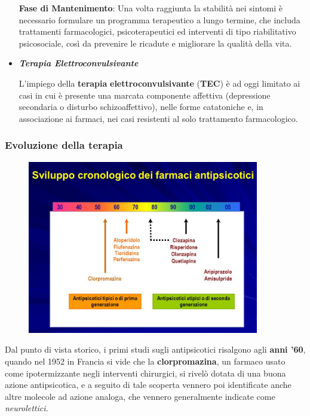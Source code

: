 \begin{itemize}
\textbf{Fase di Mantenimento}: Una volta raggiunta la stabilità nei
sintomi è necessario formulare un programma terapeutico a lungo termine,
che includa trattamenti farmacologici, psicoterapeutici ed interventi di
tipo riabilitativo psicosociale, così da prevenire le ricadute e
migliorare la qualità della vita.

\item
  \textbf{\emph{Terapia Elettroconvulsivante}}

L'impiego della \textbf{terapia} \textbf{elettroconvulsivante}
(\textbf{TEC}) è ad oggi limitato ai casi in cui è presente una marcata
componente affettiva (depressione secondaria o disturbo
schizoaffettivo), nelle forme catatoniche e, in associazione ai farmaci,
nei casi resistenti al solo trattamento farmacologico.

\end{itemize}

\subsubsection{Evoluzione della terapia}

\begin{figure}[!ht]
\centering
	\includegraphics[width=0.9\textwidth]{07/image2.jpeg}
\end{figure}

Dal punto di vista storico, i primi studi sugli antipsicotici risalgono
agli \textbf{anni '60}, quando nel 1952 in Francia si vide che la
\textbf{clorpromazina}, un farmaco usato come ipotermizzante negli
interventi chirurgici, si rivelò dotata di una buona azione
antipsicotica, e a seguito di tale scoperta vennero poi identificate
anche altre molecole ad azione analoga, che vennero generalmente
indicate come \emph{neurolettici.}

